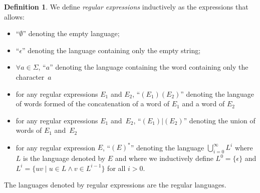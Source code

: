 \documentclass[11px]{article}
\theoremstyle{definition}
\newtheorem{definition}{Definition}
\begin{document}
        \begin{definition}%
          \label{def:regex}
          We define \emph{regular expressions} inductively as the expressions
          that allows:
            \begin{itemize}
              \item ``$\emptyset$'' denoting the empty language;
              \item ``$\epsilon$'' denoting the language containing only the
                empty string;
              \item $\forall a \in \Sigma$, ``$a$'' denoting the language
                containing the word containing only the character~$a$
              \item for any regular expressions $E_1$ and $E_2$, ``$(E_1)
                (E_2)$'' denoting the language of words formed of the
                concatenation of a word of $E_1$ and a word of $E_2$
              \item for any regular expressions $E_1$ and~$E_2$,
                ``$(E_1)|(E_2)$'' denoting the union of words of $E_1$
                and~$E_2$
              \item for any regular expression $E$, ``${(E)}^*$'' denoting the
                language $\bigcup_{i = 0}^\infty L^i$ where $L$ is the
                language denoted by $E$ and where we inductively define $L^0 =
                \{\epsilon\}$ and $L^i = \{uv \mid u \in L \land v \in
                L^{i-1}\}$ for all $i > 0$.
            \end{itemize}

          The languages denoted by regular expressions are the regular
          languages.

        \end{definition}
\end{document}
